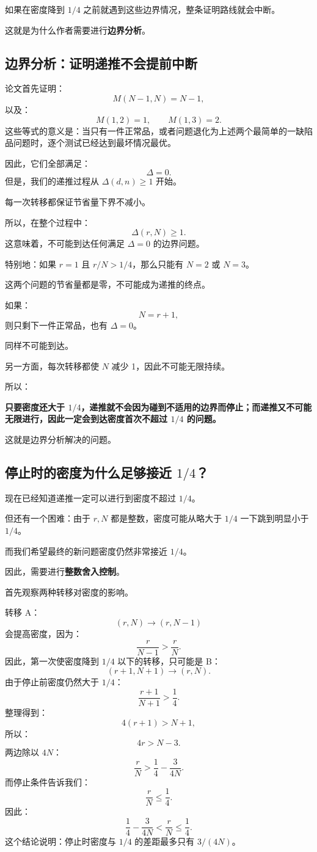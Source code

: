 \documentclass[UTF8,11pt]{ctexart}
\begin{document}
如果在密度降到 $1/4$ 之前就遇到这些边界情况，整条证明路线就会中断。

这就是为什么作者需要进行\textbf{边界分析}。

\subsection{边界分析：证明递推不会提前中断}
论文首先证明：
\[M(N-1,N)=N-1,\]
以及：
\[M(1,2)=1,\qquad M(1,3)=2.\]
这些等式的意义是：当只有一件正常品，或者问题退化为上述两个最简单的一缺陷品问题时，逐个测试已经达到最坏情况最优。

因此，它们全部满足：
\[\Delta=0.\]
但是，我们的递推过程从 $\Delta(d,n)\ge1$ 开始。

每一次转移都保证节省量下界不减小。

所以，在整个过程中：
\[\Delta(r,N)\ge1.\]
这意味着，不可能到达任何满足 $\Delta=0$ 的边界问题。

特别地：如果 $r=1$ 且 $r/N>1/4$，那么只能有 $N=2$ 或 $N=3$。

这两个问题的节省量都是零，不可能成为递推的终点。

如果：
\[N=r+1,\]
则只剩下一件正常品，也有 $\Delta=0$。

同样不可能到达。

另一方面，每次转移都使 $N$ 减少 1，因此不可能无限持续。

所以：

\textbf{只要密度还大于 $1/4$，递推就不会因为碰到不适用的边界而停止；而递推又不可能无限进行，因此一定会到达密度首次不超过 $1/4$ 的问题。}

这就是边界分析解决的问题。

\subsection{停止时的密度为什么足够接近 $1/4$？}
现在已经知道递推一定可以进行到密度不超过 $1/4$。

但还有一个困难：由于 $r,N$ 都是整数，密度可能从略大于 $1/4$ 一下跳到明显小于 $1/4$。

而我们希望最终的新问题密度仍然非常接近 $1/4$。

因此，需要进行\textbf{整数舍入控制}。

首先观察两种转移对密度的影响。

转移 A：
\[(r,N)\to(r,N-1)\]
会提高密度，因为：
\[\frac r{N-1}>\frac rN.\]
因此，第一次使密度降到 $1/4$ 以下的转移，只可能是 B：
\[(r+1,N+1)\to(r,N).\]
由于停止前密度仍然大于 $1/4$：
\[\frac{r+1}{N+1}>\frac14.\]
整理得到：
\[4(r+1)>N+1,\]
所以：
\[4r>N-3.\]
两边除以 $4N$：
\[\frac rN>\frac14-\frac3{4N}.\]
而停止条件告诉我们：
\[\frac rN\le\frac14.\]
因此：
\begin{equation}\boxed{\frac14-\frac3{4N}<\frac rN\le\frac14.}\tag{6}\end{equation}
这个结论说明：停止时密度与 $1/4$ 的差距最多只有 $3/(4N)$。
\end{document}
